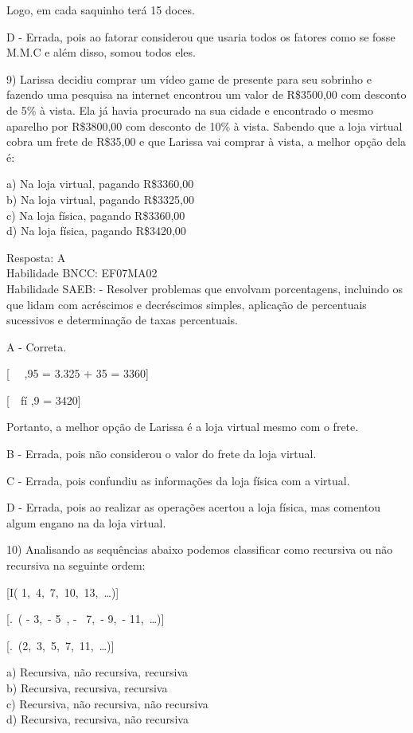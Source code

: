 Logo, em cada saquinho terá 15 doces.

D - Errada, pois ao fatorar considerou que usaria todos os fatores como
se fosse M.M.C e além disso, somou todos eles.

9) Larissa decidiu comprar um vídeo game de presente para seu sobrinho e
fazendo uma pesquisa na internet encontrou um valor de R\$3500,00 com
desconto de 5\% à vista. Ela já havia procurado na sua cidade e
encontrado o mesmo aparelho por R\$3800,00 com desconto de 10\% à vista.
Sabendo que a loja virtual cobra um frete de R\$35,00 e que Larissa vai
comprar à vista, a melhor opção dela é:

a) Na loja virtual, pagando R\$3360,00\\
b) Na loja virtual, pagando R\$3325,00\\
c) Na loja física, pagando R\$3360,00\\
d) Na loja física, pagando R\$3420,00

Resposta: A\\
Habilidade BNCC: EF07MA02\\
Habilidade SAEB: - Resolver problemas que envolvam porcentagens,
incluindo os que lidam com acréscimos e decréscimos simples, aplicação
de percentuais sucessivos e determinação de taxas percentuais.

A - Correta.

[\ \   ,95 = 3.325 + 35 = 3360]

[\ \ fí  ,9 = 3420]

Portanto, a melhor opção de Larissa é a loja virtual mesmo com o frete.

B - Errada, pois não considerou o valor do frete da loja virtual.

C - Errada, pois confundiu as informações da loja física com a virtual.

D - Errada, pois ao realizar as operações acertou a loja física, mas
comentou algum engano na da loja virtual.

10) Analisando as sequências abaixo podemos classificar como recursiva
ou não recursiva na seguinte ordem:

[I\left( 1,\ 4,\ 7,\ 10,\ 13,\ \ldots \right)]

[.\ ( - 3,\  - 5\ , - \ 7,\  - 9,\  - 11,\ \ldots)]

[.\ (2,\ 3,\ 5,\ 7,\ 11,\ \ldots)]

a) Recursiva, não recursiva, recursiva\\
b) Recursiva, recursiva, recursiva\\
c) Recursiva, não recursiva, não recursiva\\
d) Recursiva, recursiva, não recursiva

